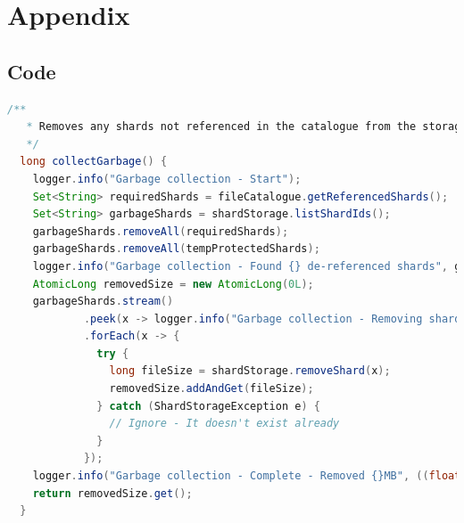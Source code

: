 \documentclass[11pt, a4paper, twocolumn, twoside]{report}
\begin{document}


\newpage

\chapter*{Appendix}

\section{Code}

\begin{lstlisting}[language=Java, caption=Garbage Collection Implementation, label=lst:fileGC]
  /**
   * Removes any shards not referenced in the catalogue from the storage.
   */
  long collectGarbage() {
    logger.info("Garbage collection - Start");
    Set<String> requiredShards = fileCatalogue.getReferencedShards();
    Set<String> garbageShards = shardStorage.listShardIds();
    garbageShards.removeAll(requiredShards);
    garbageShards.removeAll(tempProtectedShards);
    logger.info("Garbage collection - Found {} de-referenced shards", garbageShards.size());
    AtomicLong removedSize = new AtomicLong(0L);
    garbageShards.stream()
            .peek(x -> logger.info("Garbage collection - Removing shard: [{}]", x))
            .forEach(x -> {
              try {
                long fileSize = shardStorage.removeShard(x);
                removedSize.addAndGet(fileSize);
              } catch (ShardStorageException e) {
                // Ignore - It doesn't exist already
              }
            });
    logger.info("Garbage collection - Complete - Removed {}MB", ((float) removedSize.get()) / (1024 * 1024));
    return removedSize.get();
  }
\end{lstlisting}
\end{document}
